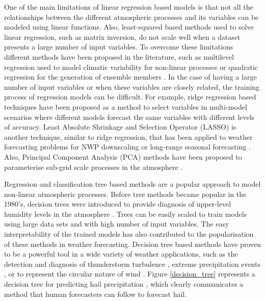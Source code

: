 \medskip

One of the main limitations of linear regression based models is that not all the relationships between the different atmospheric processes and its variables can be modeled using linear functions. Also, least-squared based methods used to solve linear regression, such as matrix inversion, do not scale well when a dataset presents a large number of input variables. To overcome these limitations different methods have been proposed in the literature, such as multilevel regression used to model climatic variability for non-linear processes \citep{kravtsov2005multilevel} or quadratic regression for the generation of ensemble members \citep{hodyss2013square}. In the case of having a large number of input variables or when these variables are closely related, the training process of regression models can be difficult. For example, ridge regression based techniques have been proposed as a method to select variables in multi-model scenarios \citep{delsole2013scale} where different models forecast the same variables with different levels of accuracy. Least Absolute Shrinkage and Selection Operator (LASSO) is another technique, similar to ridge regression, that has been applied to weather forecasting problems for NWP downscaling \citep{hofer2017evaluating} or long-range seasonal forecasting \citep{delsole2017statistical}. Also, Principal Component Analysis (PCA) methods have been proposed to parameterise sub-grid scale processes in the atmosphere \citep{godfrey2010empirical}.

\medskip

Regression and classification tree based methods are a popular approach to model non-linear atmospheric processes. Before tree methods became popular in the 1980's, decision trees were introduced to provide diagnosis of upper-level humidity levels in the atmosphere \citep{chisholm1968diagnosis}. Trees can be easily scaled to train models using large data sets and with high number of input variables. The easy interpretability of the trained models has also contributed to the popularisation of these methods in weather forecasting. Decision tree based methods have proven to be a powerful tool in a wide variety of weather applications, such as the detection and diagnosis of thunderstorm turbulence \citep{williams2008remote}, extreme precipitation events \citep{herman2018money}, or to represent the circular nature of wind \citep{larraondo2018system}. Figure \ref{decision_tree} represents a decision tree for predicting hail precipitation \citep{mcgovern2017using}, which clearly communicates a method that human forecasters can follow to forecast hail.

